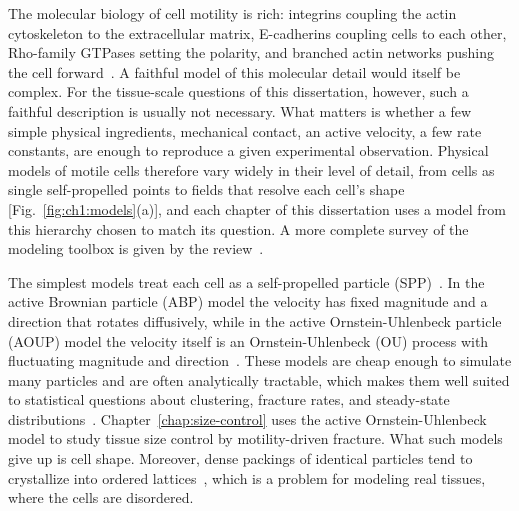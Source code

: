 The molecular biology of cell motility is rich: integrins coupling the actin cytoskeleton to the extracellular matrix, E-cadherins coupling cells to each other, Rho-family GTPases setting the polarity, and branched actin networks pushing the cell forward~\cite{parsons2010cell, ridley2003cell, demali2003coupling, dufour2013alpha, rappel2017mechanisms}.
A faithful model of this molecular detail would itself be complex.
For the tissue-scale questions of this dissertation, however, such a faithful description is usually not necessary.
What matters is whether a few simple physical ingredients, mechanical contact, an active velocity, a few rate constants, are enough to reproduce a given experimental observation.
Physical models of motile cells therefore vary widely in their level of detail, from cells as single self-propelled points to fields that resolve each cell's shape [Fig.~\ref{fig:ch1:models}(a)], and each chapter of this dissertation uses a model from this hierarchy chosen to match its question.
A more complete survey of the modeling toolbox is given by the review~\cite{camley2017physical}.

The simplest models treat each cell as a self-propelled particle (SPP)~\cite{fily2012athermal, levine2000self, copenhagen2018frustration, sanoria2026chemotaxis}.
In the active Brownian particle (ABP) model the velocity has fixed magnitude and a direction that rotates diffusively, while in the active Ornstein-Uhlenbeck particle (AOUP) model the velocity itself is an Ornstein-Uhlenbeck (OU) process with fluctuating magnitude and direction~\cite{dunn1987unified, fily2012athermal, fodor2016far}.
These models are cheap enough to simulate many particles and are often analytically tractable, which makes them well suited to statistical questions about clustering, fracture rates, and steady-state distributions~\cite{fodor2016far, henkes2020dense, wang2026controlling}.
Chapter~\ref{chap:size-control} uses the active Ornstein-Uhlenbeck model to study tissue size control by motility-driven fracture.
What such models give up is cell shape. Moreover, dense packings of identical particles tend to crystallize into ordered lattices~\cite{prakash2021motility}, which is a problem for modeling real tissues, where the cells are disordered.

